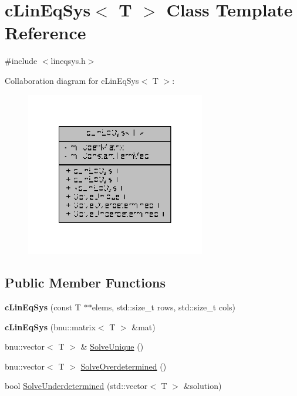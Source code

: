 \hypertarget{classcLinEqSys}{\section{c\-Lin\-Eq\-Sys$<$ T $>$ Class Template Reference}
\label{classcLinEqSys}
}


{\ttfamily \#include $<$lineqsys.\-h$>$}



Collaboration diagram for c\-Lin\-Eq\-Sys$<$ T $>$\-:
\nopagebreak
\begin{figure}[H]
\begin{center}
\leavevmode
\includegraphics[width=222pt]{classcLinEqSys__coll__graph}
\end{center}
\end{figure}
\subsection*{Public Member Functions}
\begin{DoxyCompactItemize}
\item 
\hypertarget{classcLinEqSys_ab80e0ee1bf57383bd6b04c8e5878eeed}{{\bfseries c\-Lin\-Eq\-Sys} (const T $\ast$$\ast$elems, std\-::size\-\_\-t rows, std\-::size\-\_\-t cols)}\label{classcLinEqSys_ab80e0ee1bf57383bd6b04c8e5878eeed}

\item 
\hypertarget{classcLinEqSys_aee02a711deb23dfd1ce69bfaa06bd257}{{\bfseries c\-Lin\-Eq\-Sys} (bnu\-::matrix$<$ T $>$ \&mat)}\label{classcLinEqSys_aee02a711deb23dfd1ce69bfaa06bd257}

\item 
bnu\-::vector$<$ T $>$ \& \hyperlink{classcLinEqSys_a39978bcfd4366712d09e7eb54bb09cef}{Solve\-Unique} ()
\item 
bnu\-::vector$<$ T $>$ \hyperlink{classcLinEqSys_ad3d9edcf200c3256220054f5ee0fdaeb}{Solve\-Overdetermined} ()
\item 
bool \hyperlink{classcLinEqSys_a7144d697d601517aead8642f5956a9b0}{Solve\-Underdetermined} (std\-::vector$<$ T $>$ \&solution)
\end{DoxyCompactItemize}
